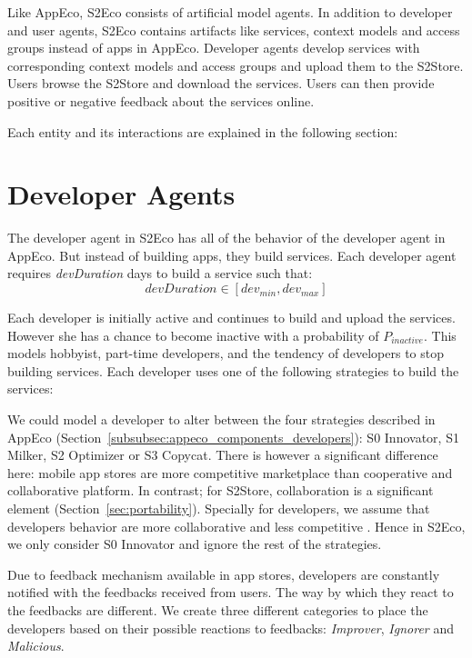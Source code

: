 Like AppEco, S2Eco consists of artificial model agents. In addition to developer and user agents, S2Eco contains artifacts like services, context models and access groups instead of apps in AppEco. Developer agents develop services with corresponding context models and access groups and upload them to the S2Store. Users browse the S2Store and download the services. Users can then provide positive or negative feedback about the services online.

Each entity and its interactions are explained in the following section:

\section{Developer Agents}

The developer agent in S2Eco has all of the behavior of the developer agent in AppEco. But instead of building apps, they build services. Each developer agent requires \emph{devDuration} days to build a service such that: $$devDuration \in [dev_{min}, dev_{max}]$$

Each developer is initially active and continues to build and upload the services. However she has a chance to become inactive with a probability of $P_{inactive}$. This models hobbyist, part-time developers, and the tendency of developers to stop building services. Each developer uses one of the following strategies to build the services:

We could model a developer to alter between the four strategies described in AppEco (Section~\ref{subsubsec:appeco_components_developers}): S0 Innovator, S1 Milker, S2 Optimizer or S3 Copycat. There is however a significant difference here: mobile app stores are more competitive marketplace than cooperative and collaborative platform. In contrast; for S2Store, collaboration is a significant element (Section~\ref{sec:portability}). Specially for developers, we assume that developers behavior are more collaborative and less competitive \cite{dabbish2012social}. Hence in S2Eco, we only consider S0 Innovator and ignore the rest of the strategies.

Due to feedback mechanism available in app stores, developers are constantly notified with the feedbacks received from users. The way by which they react to the feedbacks are different. We create three different categories to place the developers based on their possible reactions to feedbacks: \emph{Improver}, \emph{Ignorer} and \emph{Malicious}.

